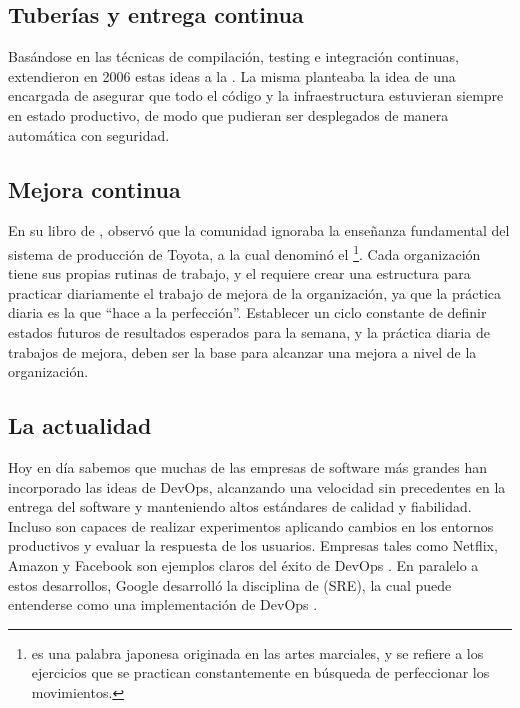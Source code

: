 %
\subsection{Tuberías y entrega continua}
%
Basándose en las técnicas de compilación, testing e integración
continuas, \citeauthor{humblefarley} extendieron en 2006 estas ideas a
la  \cite{humblefarley}. La misma planteaba la
idea de una  encargada de asegurar que todo el
código y la infraestructura estuvieran siempre en estado productivo,
de modo que pudieran ser desplegados de manera automática con
seguridad.
%
\subsection{Mejora continua}
%
En su libro de \citeyear{toyotakata} \cite{toyotakata},
\citeauthor{toyotakata} observó que la comunidad  ignoraba la
enseñanza fundamental del sistema de producción de Toyota, a la cual
denominó el \footnote{  es una palabra
  japonesa originada en las artes marciales, y se refiere a los
  ejercicios que se practican constantemente en búsqueda de
  perfeccionar los movimientos.}. Cada organización tiene sus propias
rutinas de trabajo, y el  requiere crear una
estructura para practicar diariamente el trabajo de mejora de la
organización, ya que la práctica diaria es la que ``hace a la
perfección''. Establecer un ciclo constante de definir estados futuros
de resultados esperados para la semana, y la práctica diaria de
trabajos de mejora, deben ser la base para alcanzar una mejora a nivel
de la organización.
%
\subsection{La actualidad}
%
Hoy en día sabemos que muchas de las empresas de software más grandes
han incorporado las ideas de DevOps, alcanzando una velocidad sin
precedentes en la entrega del software y manteniendo altos estándares
de calidad y fiabilidad. Incluso son capaces de realizar experimentos
aplicando cambios en los entornos productivos y evaluar la respuesta
de los usuarios. Empresas tales como Netflix, Amazon y Facebook son
ejemplos claros del éxito de DevOps
\cite{handbook}. En paralelo a
estos desarrollos, Google desarrolló la disciplina de
 (SRE), la cual puede entenderse como
una implementación de DevOps
\cite{sre}.
%
